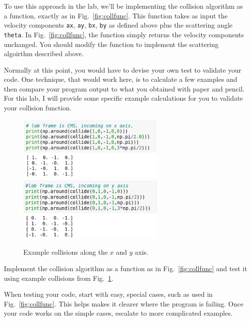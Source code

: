 To use this approach in the lab, we'll be implementing the collision
algorithm as a function, exactly as in Fig.~\ref{fig:collfunc}.  This
function takes as input the velocity components {\tt ax}, {\tt ay},
{\tt bx}, {\tt by} as defined above plus the scattering angle {\tt
  theta}.  In Fig.~\ref{fig:collfunc}, the function simply returns the
velocity components unchanged.  You should modify the function to
implement the scattering algoirthm described above.

Normally at this point, you would have to devise your own test to
validate your code.  One technique, that would work here, is to
calculate a few examples and then compare your program output to what
you obtained with paper and pencil.  For this lab, I will provide some
specific example calculations for you to validate your collision function.

\begin{figure}[htbp]
\begin{center}
  \includegraphics[width=0.65\textwidth]{figs/maxwellboltzman/collx.png} \\
  \includegraphics[width=0.65\textwidth]{figs/maxwellboltzman/colly.png} \\
  \caption{Example collisions along the $x$ and $y$ axis.}
\label{fig:collxy}
\end{center}
\end{figure}

\begin{plot} \end{plot}  Implement the collision algorithm as a function as in Fig.~\ref{fig:collfunc} and test it using example collisions from Fig.~\ref{fig:collxy}.

When testing your code, start with easy, special cases, such as used in Fig.~\ref{fig:collfunc}.  This helps makes it clearer where the program is failing.  Once your code works on the simple cases, escalate to more complicated examples.

